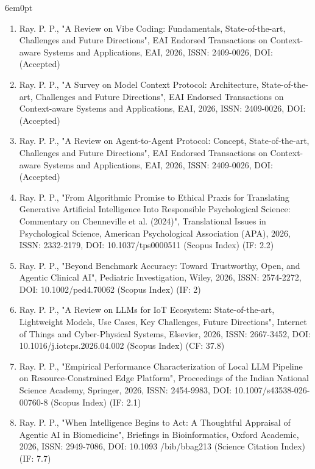 \documentclass[11pt,a4paper]{moderncv}
\begin{document}
\begin{adjustwidth}{6em}{0pt}
\begin{enumerate}
		
		\item Ray. P. P., "A Review on Vibe Coding: Fundamentals, State-of-the-art, Challenges and Future Directions", EAI Endorsed Transactions on Context-aware Systems and Applications, EAI, 2026, ISSN: 2409-0026, DOI:   (Accepted)

		\item Ray. P. P., "A Survey on Model Context Protocol: Architecture, State-of-the-art, Challenges and Future Directions", EAI Endorsed Transactions on Context-aware Systems and Applications, EAI, 2026, ISSN: 2409-0026, DOI:   (Accepted)
		
		\item Ray. P. P., "A Review on Agent-to-Agent Protocol: Concept, State-of-the-art, Challenges and Future Directions", EAI Endorsed Transactions on Context-aware Systems and Applications, EAI, 2026, ISSN: 2409-0026, DOI:   (Accepted)
		
		\item Ray. P. P., "From Algorithmic Promise to Ethical Praxis for Translating Generative Artificial Intelligence Into Responsible Psychological Science: Commentary on Chenneville et al. (2024)", Translational Issues in Psychological Science, American Psychological Association (APA), 2026, ISSN: 2332-2179, DOI: 10.1037/tps0000511 (Scopus Index) (IF: 2.2)
		
		\item Ray. P. P., "Beyond Benchmark Accuracy: Toward Trustworthy, Open, and Agentic Clinical AI", Pediatric Investigation, Wiley, 2026, ISSN: 2574-2272, DOI: 10.1002/ped4.70062 (Scopus Index) (IF: 2)
		
		\item Ray. P. P., "A Review on LLMs for IoT Ecosystem: State-of-the-art, Lightweight Models, Use Cases, Key Challenges, Future Directions", Internet of Things and Cyber-Physical Systems, Elsevier, 2026, ISSN: 2667-3452, DOI: 10.1016/j.iotcps.2026.04.002 (Scopus Index) (CF: 37.8)

		\item Ray. P. P., "Empirical Performance Characterization of Local LLM Pipeline on Resource-Constrained Edge Platform", Proceedings of the Indian National Science Academy, Springer, 2026, ISSN: 2454-9983, DOI: 10.1007/s43538-026-00760-8 (Scopus Index) (IF: 2.1)
		
		\item 	Ray. P. P., "When Intelligence Begins to Act: A Thoughtful Appraisal of Agentic AI in Biomedicine", Briefings in Bioinformatics, Oxford Academic, 2026, ISSN: 2949-7086, DOI: 10.1093 /bib/bbag213 (Science Citation Index) (IF: 7.7)
		

\end{enumerate}
\end{adjustwidth}
\end{document}
